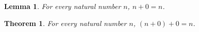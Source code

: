 \documentclass{article}
\newtheorem{lemma}{Lemma}
\newtheorem{theorem}{Theorem}
\begin{document}
\begin{lemma}For every natural number $n$, $n+0=n$.\end{lemma}
\begin{theorem}For every natural number $n$, $(n+0)+0=n$.\end{theorem}
\end{document}
